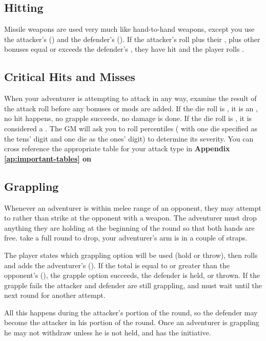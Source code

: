 \begin{multicols}{2}
\subsection{Hitting}
Missile weapons are used very much like hand-to-hand weapons, except you use the attacker's  (\MM) and the defender's  (\MDV). If the attacker's  roll plus their \MM, plus other bonuses equal or exceeds the defender's \MDV, they have hit and the player rolls .
\subsection{Critical Hits and Misses}
When your adventurer is attempting to attack in any way, examine the result of the attack roll before any bonuses or mods are added. If the die roll is , it is an , no hit happens, no grapple succeeds, no damage is
done. If the die roll is , it is considered a . The GM will ask you to roll percentiles ( with one die specified as the tens' digit and one die as the ones' digit) to determine its severity. You can cross reference the appropriate table for your attack type in \textbf{Appendix \ref{ap:important-tables} on }
\subsection{Grappling}
Whenever an adventurer is within melee range of an opponent, they may attempt to  rather than strike at the opponent with a weapon. The adventurer must drop anything they are holding at the beginning of the round so that both hands are free.  take a full round to drop, your adventurer's arm is in a couple of straps.

The player states which grappling option will be used (hold or throw), then rolls  and adds the adventurer's  (\GM). If the total is equal to or greater than the opponent's  (\GDV), the grapple option succeeds, the defender is held, or thrown. If the grapple fails the attacker and defender are still grappling, and must wait until the next round for another attempt.

All this happens during the attacker's portion of the round, so the defender may become the attacker in his portion of the round. Once an adventurer is grappling he may not withdraw unless he is not held, and has the initiative.

\end{multicols}
